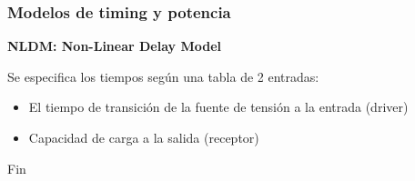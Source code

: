 \documentclass{beamer}
\begin{document}
\begin{frame}
  \frametitle{Modelos de timing y potencia} 

 \textbf{NLDM: Non-Linear Delay Model} 
   \begin{figure}[ht]
      \centering
    \end{figure}
    Se especifica los tiempos según una tabla de 2 entradas:
    \begin{itemize}
	\item El tiempo de transición de la fuente de tensión a la entrada (driver)
	\item Capacidad de carga a la salida (receptor)
\end{itemize}

\end{frame}


\begin{frame}
\Huge{\centerline{Fin}}
\end{frame}

\end{document}
